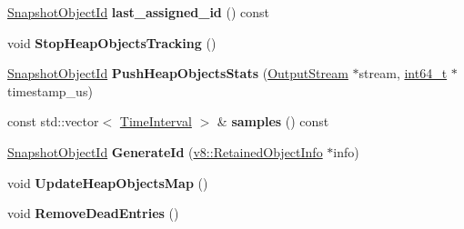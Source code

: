 \begin{DoxyCompactItemize}
\mbox{\hyperlink{classuint32__t}{Snapshot\+Object\+Id}} {\bfseries last\+\_\+assigned\+\_\+id} () const
\item 
\mbox{\label{classv8_1_1internal_1_1HeapObjectsMap_a73ec46f75f7c486e3fcec5643766c442}} 
void {\bfseries Stop\+Heap\+Objects\+Tracking} ()
\item 
\mbox{\label{classv8_1_1internal_1_1HeapObjectsMap_a814bf7c07146cb91a42206cfcb71d7bf}} 
\mbox{\hyperlink{classuint32__t}{Snapshot\+Object\+Id}} {\bfseries Push\+Heap\+Objects\+Stats} (\mbox{\hyperlink{classv8_1_1OutputStream}{Output\+Stream}} $\ast$stream, \mbox{\hyperlink{classint64__t}{int64\+\_\+t}} $\ast$timestamp\+\_\+us)
\item 
\mbox{\label{classv8_1_1internal_1_1HeapObjectsMap_a2c9d0f200953b276746ee601813b8134}} 
const std\+::vector$<$ \mbox{\hyperlink{structv8_1_1internal_1_1HeapObjectsMap_1_1TimeInterval}{Time\+Interval}} $>$ \& {\bfseries samples} () const
\item 
\mbox{\label{classv8_1_1internal_1_1HeapObjectsMap_a246be15ede06e7dd8211be57c67b140c}} 
\mbox{\hyperlink{classuint32__t}{Snapshot\+Object\+Id}} {\bfseries Generate\+Id} (\mbox{\hyperlink{classv8_1_1RetainedObjectInfo}{v8\+::\+Retained\+Object\+Info}} $\ast$info)
\item 
\mbox{\label{classv8_1_1internal_1_1HeapObjectsMap_af0743759fc64433e0a2b207168dfb566}} 
void {\bfseries Update\+Heap\+Objects\+Map} ()
\item 
\mbox{\label{classv8_1_1internal_1_1HeapObjectsMap_a11421eef0d71d30bee53d0112e19efeb}} 
void {\bfseries Remove\+Dead\+Entries} ()
\end{DoxyCompactItemize}
